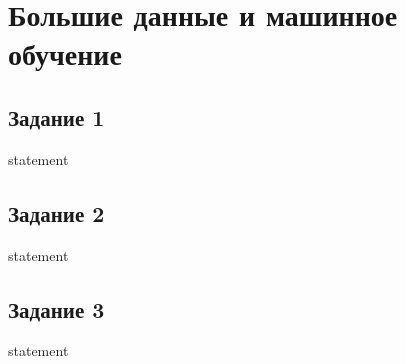 \chapter{Большие данные и машинное обучение}

\section{Задание 1}
{statement}
\section{Задание 2}
{statement}
\section{Задание 3}
{statement}